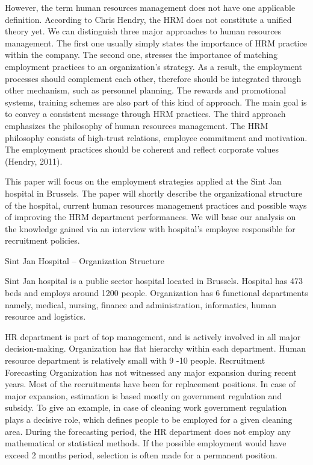 \documentclass[a4paper,fleqn,11pt,dvips,titlepage]{article}
\numberwithin{figure}{section}
\numberwithin{equation}{section}
\begin{document}
However, the term human resources management does not have one applicable definition. According to Chris Hendry, the HRM does not constitute a unified theory yet. We can distinguish three major approaches to human resources management. The first one usually simply states the importance of HRM practice within the company. The second one, stresses the importance of matching employment practices to an organization’s strategy. As a result, the employment processes should complement each other, therefore should be integrated through other mechanism, such as personnel planning. The rewards and promotional systems, training schemes are also part of this kind of approach. The main goal is to convey a consistent message through HRM practices. The third approach emphasizes the philosophy of human resources management. The HRM philosophy consists of high-trust relations, employee commitment and motivation. The employment practices should be coherent and reflect corporate values (Hendry, 2011).

This paper will focus on the employment strategies applied at the Sint Jan hospital in Brussels. The paper will shortly describe the organizational structure of the hospital, current human resources management practices and possible ways of improving the HRM department performances. We will base our analysis on the knowledge gained via an interview with hospital’s employee responsible for recruitment policies. 





Sint Jan Hospital – Organization Structure

Sint Jan hospital is a public sector hospital located in Brussels. Hospital has 473 beds and employs around 1200 people.  Organization has 6 functional departments namely, medical, nursing, finance and administration, informatics, human resource and logistics. 




HR department is part of top management, and is actively involved in all major decision-making. Organization has flat hierarchy within each department. Human resource department is relatively small with 9 -10 people.  
Recruitment 
Forecasting
Organization has not witnessed any major expansion during recent years. Most of the recruitments have been for replacement positions. In case of major expansion, estimation is based mostly on government regulation and subsidy. To give an example, in case of cleaning work government regulation plays a decisive role, which defines people to be employed for a given cleaning area. During the forecasting period, the HR department does not employ any mathematical or statistical methods.  If the possible employment would have exceed 2 months period, selection is often made for a permanent position. 
\end{document}
